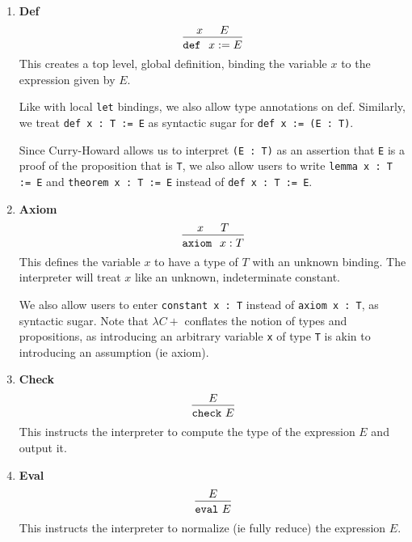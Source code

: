 \documentclass{article}
\begin{document}
\begin{enumerate}
\item \textbf{Def} \\
\[
  \begin{prooftree}
    \hypo{x}
    \hypo{E}
    \infer2{\deff \, x := E}
  \end{prooftree}
\]
This creates a top level, global definition, binding the variable $x$ to the
expression given by $E$.

Like with local \verb|let| bindings, we also allow type annotations on def.
Similarly, we treat \verb|def x : T := E| as syntactic sugar for
\verb|def x := (E : T)|.

Since Curry-Howard allows us to interpret \verb|(E : T)| as an assertion
that \verb|E| is a proof of the proposition that is \verb|T|, we also allow
users to write \verb|lemma x : T := E| and \verb|theorem x : T := E| instead of
\verb|def x : T := E|.

\item \textbf{Axiom} \\
\[
  \begin{prooftree}
    \hypo{x}
    \hypo{T}
    \infer2{\axiom \, x : T}
  \end{prooftree}
\]
This defines the variable $x$ to have a type of $T$ with an unknown binding.
The interpreter will treat $x$ like an unknown, indeterminate constant.

We also allow users to enter \verb|constant x : T| instead of \verb|axiom x : T|,
as syntactic sugar. Note that $\lambda C+$ conflates the notion of types and
propositions, as introducing an arbitrary variable \verb|x| of type \verb|T| is 
akin to introducing an assumption (ie axiom).

\item \textbf{Check} \\
\[
  \begin{prooftree}
    \hypo{E}
    \infer1{\checkk \,\, E}
  \end{prooftree}
\]
This instructs the interpreter to compute the type of the expression $E$ and
output it.

\item \textbf{Eval} \\
\[
  \begin{prooftree}
    \hypo{E}
    \infer1{\evall \,\, E}
  \end{prooftree}
\]
This instructs the interpreter to normalize (ie fully reduce) the expression $E$.


\end{enumerate}
\end{document}
